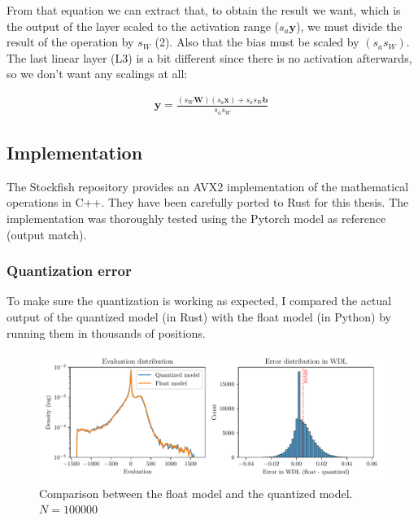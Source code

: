 From that equation we can extract that, to obtain the result we want, which is the output of the layer scaled to the activation range ($s_a \bm{y}$), we must divide the result of the operation by $s_W$ (2). Also that the bias must be scaled by $(s_a s_W)$. \\

The last linear layer (L3) is a bit different since there is no activation afterwards, so we don't want any scalings at all:

\begin{equation}
\begin{aligned}
\bm{y} = \frac{(s_W \bm{W}) (s_a \bm{x}) + s_a s_W \bm{b}}{s_a s_W}
\end{aligned}
\end{equation}


\subsection{Implementation}

The Stockfish repository provides an AVX2 implementation of the mathematical operations in C++. They have been carefully ported to Rust for this thesis. The implementation was thoroughly tested using the Pytorch model as reference (output match).

\subsubsection{Quantization error}

To make sure the quantization is working as expected, I compared the actual output of the quantized model (in Rust) with the float model (in Python) by running them in thousands of positions.


\begin{figure}[H]
\centering
\includegraphics[width=\textwidth]{./dynamic/output/quant_errors.pdf}
\caption{Comparison between the float model and the quantized model. $N=100000$}
\label{fig:quant_errors}
\end{figure}

